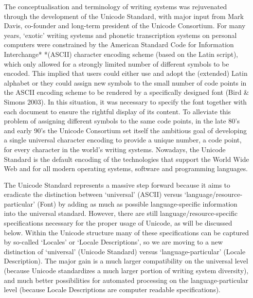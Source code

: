 {{{{{{{{{{The conceptualisation and terminology of writing systems was rejuvenated through the development of the Unicode Standard, with major input from Mark Davis, co-founder and long-term president of the Unicode Consortium. For many years, `exotic' writing systems and phonetic transcription systems on personal computers were constrained by the American Standard Code for Information Interchange* *(ASCII) character encoding scheme (based on the Latin script), which only allowed for a strongly limited number of different symbols to be encoded. This implied that users could either use and adopt the (extended) Latin alphabet or they could assign new symbols to the small number of code points in the ASCII encoding scheme to be rendered by a specifically designed font (Bird \& Simons 2003). In this situation, it was necessary to specify the font together with each document to ensure the rightful display of its content. To alleviate this problem of assigning different symbols to the same code points, in the late 80's and early 90's the Unicode Consortium set itself the ambitious goal of developing a single universal character encoding to provide a unique number, a code point, for every character in the world's writing systems. Nowadays, the Unicode Standard is the default encoding of the technologies that support the World Wide Web and for all modern operating systems, software and programming languages.

The Unicode Standard represents a massive step forward because it aims to eradicate the distinction between `universal' (ASCII) versus `language/resource-particular' (Font) by adding as much as possible language-specific information into the universal standard. However, there are still language/resource-specific specifications necessary for the proper usage of Unicode, as will be discussed below. Within the Unicode structure many of these specifications can be captured by so-called `Locales' or `Locale Descriptions', so we are moving to a new distinction of `universal' (Unicode Standard) versus `language-particular' (Locale Description). The major gain is a much larger compatibility on the universal level (because Unicode standardizes a much larger portion of writing system diversity), and much better possibilities for automated processing on the language-particular level (because Locale Descriptions are computer readable specifications).

}}}}}}}}}}
